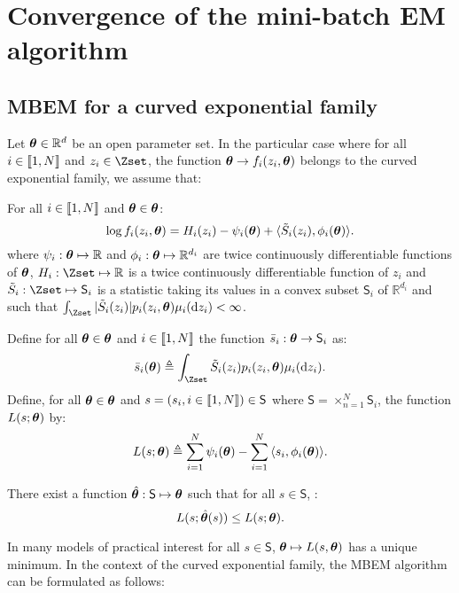 \section{Convergence of the mini-batch EM algorithm}\label{sec:mbem}

\subsection{MBEM for a curved exponential family} \label{sssec:expo}
Let $\bm{\theta} \in \mathbb{R}^d$ be  an open parameter set. In the particular case where for all $i \in \llbracket1,N\rrbracket$ and $z_i \in \Zset$, the function $\bm{\theta} \to f_i(z_i,\bm{\theta})$ belongs to the curved exponential family, we assume that:
\begin{assumption_expo}
For all $i \in \llbracket1,N\rrbracket$ and $\bm{\theta} \in \bm{\theta}$:
\begin{equation}
\log f_i(z_i,\bm{\theta}) = H_i(z_i) -\psi_i(\bm{\theta}) + \langle \tilde{S}_i(z_i), \phi_i(\bm{\theta})\rangle.
\end{equation}
where $\psi_i: \bm{\theta} \mapsto \mathbb{R}$ and $\phi_i: \bm{\theta} \mapsto \mathbb{R}^{d_i}$ are twice continuously differentiable functions of $\bm{\theta}$, $H_i: \Zset \mapsto \mathbb{R}$ is a twice continuously differentiable function of $z_i$ and $\tilde{S}_i: \Zset \mapsto \mathsf{S}_i$ is a statistic taking its values in a convex subset $\mathsf{S}_i$ of $\mathbb{R}^{d_i}$ and such that $\int_{\Zset}{|\tilde{S}_i(z_i)|p_i(z_i,\prm) \mu_i(\dz_i)} < \infty$.
\end{assumption_expo}
\noindent Define for all $\bm{\theta} \in \bm{\theta}$ and $i \in \llbracket1,N\rrbracket$ the function $\bar{s}_i: \bm{\theta} \to \mathsf{S}_i$ as:
\begin{equation}
\bar{s}_i(\prm) \triangleq \int_{\Zset}{\tilde{S}_i(z_i)p_i(z_i,\prm) \mu_i(\dz_i)}.
\end{equation}
Define, for all $\bm{\theta} \in \bm{\theta}$ and $s = (s_i, i \in \llbracket1,N\rrbracket) \in \mathsf{S}$ where $\mathsf{S} = \times_{n=1}^N \mathsf{S}_i$, the function $L(s; \bm{\theta})$ by:
\begin{equation}\label{curvedL}
L(s;\bm{\theta}) \triangleq \sum_{i=1}^N{\psi_i(\bm{\theta})} - \sum_{i=1}^N{\langle s_i, \phi_i(\bm{\theta})\rangle}.
\end{equation}
\begin{assumption_expo}
There exist a function $\hat{\bm{\theta}}: \mathsf{S} \mapsto \bm{\theta}$ such that for all $s \in \mathsf{S}$, :
\begin{equation}\label{max_suff}
L(s;\hat{\bm{\theta}}(s))\leq L(s;\bm{\theta}).
\end{equation}
\end{assumption_expo}
In many models of practical interest for all $s \in \mathsf{S}$, $\bm{\theta} \mapsto L(s,\bm{\theta})$ has a unique minimum. In the context of the curved exponential family, the MBEM algorithm can be formulated as follows:


